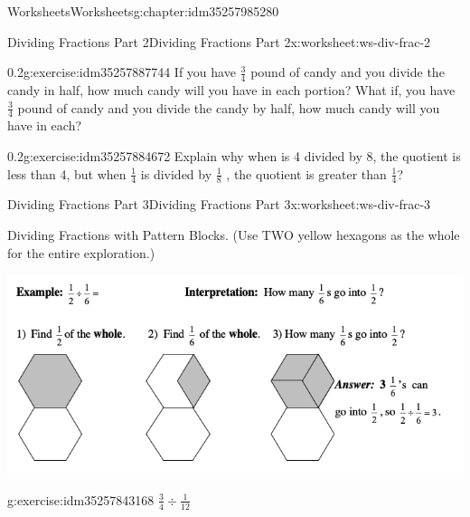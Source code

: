 \documentclass[twoside,11pt,]{book}
\begin{document}
\begin{chapterptx}{Worksheets}{}{Worksheets}{}{}{g:chapter:idm35257985280}
\begin{worksheet-section-numberless}{Dividing Fractions Part 2}{}{Dividing Fractions Part 2}{}{}{x:worksheet:ws-div-frac-2}
\begin{divisionexercise}{6}{}{0.2}{g:exercise:idm35257887744}
If you have \(\frac{3}{4} \) pound of candy and you divide the candy in half, how much candy will you have in each portion? What if, you have \(\frac{3}{4} \) pound of candy and you divide the candy by half, how much candy will you have in each?%
\end{divisionexercise}%
\clearpage
\begin{divisionexercise}{7}{}{0.2}{g:exercise:idm35257884672}%
Explain why when is 4 divided by 8, the quotient is less than 4, but when \(\frac{1}{4} \)  is divided by \(\frac{1}{8} \) , the quotient is greater than \(\frac{1}{4} \)?%
\end{divisionexercise}%
\end{worksheet-section-numberless}
\restoregeometry
%
%
\typeout{************************************************}
\typeout{************************************************}
%
\begin{worksheet-section-numberless}{Dividing Fractions Part 3}{}{Dividing Fractions Part 3}{}{}{x:worksheet:ws-div-frac-3}
\begin{introduction}{}%
Dividing Fractions with Pattern Blocks. (Use TWO yellow hexagons as the whole for the entire exploration.)%
\begin{sidebyside}{1}{0}{0}{0}%
\begin{sbspanel}{1}%
\includegraphics[width=1\linewidth]{images/frac-div-hex-1.png}
\end{sbspanel}%
\end{sidebyside}%
\end{introduction}%
\begin{divisionexercise}{1}{}{}{g:exercise:idm35257843168}%
\(\frac{3}{4} \div \frac{1}{12} \)%
\begin{sidebyside}{1}{0.15}{0.15}{0}%
\begin{sbspanel}{0.7}%

\end{sbspanel}
\end{sidebyside}
\end{divisionexercise}
\end{worksheet-section-numberless}
\end{chapterptx}
\end{document}
